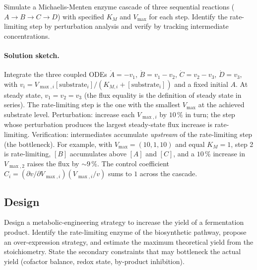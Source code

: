 \begin{exercise}
Simulate a Michaelis-Menten enzyme cascade of three sequential
reactions ($A \rightarrow B \rightarrow C \rightarrow D$) with
specified $K_M$ and $V_{\max}$ for each step. Identify the
rate-limiting step by perturbation analysis and verify by tracking
intermediate concentrations.
\end{exercise}

\paragraph{Solution sketch.}
Integrate the three coupled ODEs $\dot A = -v_1$, $\dot B = v_1 -
v_2$, $\dot C = v_2 - v_3$, $\dot D = v_3$, with $v_i = V_{\max,i}
[\text{substrate}_i]/(K_{M,i} + [\text{substrate}_i])$ and a fixed
initial $A$. At steady state, $v_1 = v_2 = v_3$ (the flux equality is
the definition of steady state in series). The rate-limiting step is
the one with the smallest $V_{\max}$ at the achieved substrate level.
Perturbation: increase each $V_{\max,i}$ by $10\,\%$ in turn; the
step whose perturbation produces the largest steady-state flux
increase is rate-limiting. Verification: intermediates accumulate
\emph{upstream} of the rate-limiting step (the bottleneck). For
example, with $V_{\max} = (10, 1, 10)$ and equal $K_M = 1$, step 2
is rate-limiting, $[B]$ accumulates above $[A]$ and $[C]$, and a
$10\,\%$ increase in $V_{\max,2}$ raises the flux by $\sim 9\,\%$.
The control coefficient $C_i = (\partial v/\partial V_{\max,i})
(V_{\max,i}/v)$ sums to $1$ across the cascade.

\subsection*{Design}

\begin{exercise}
Design a metabolic-engineering strategy to increase the yield of a
fermentation product. Identify the rate-limiting enzyme of the
biosynthetic pathway, propose an over-expression strategy, and
estimate the maximum theoretical yield from the stoichiometry. State
the secondary constraints that may bottleneck the actual yield
(cofactor balance, redox state, by-product inhibition).
\end{exercise}

